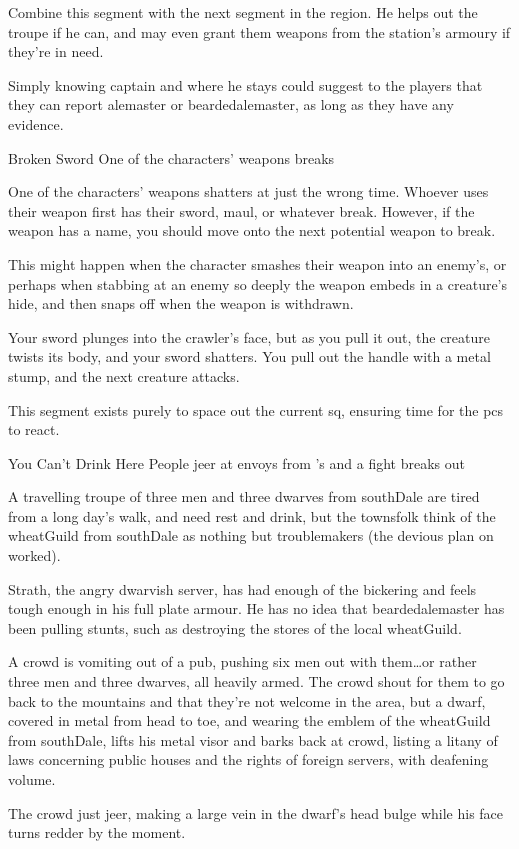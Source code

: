Combine this \gls{segment} with the next \gls{segment} in the \gls{region}.
He helps out the troupe if he can, and may even grant them \glspl{weapon} from the station's armoury if they're in need.

\captain

Simply knowing \gls{captain} and where he stays could suggest to the players that they can report \gls{alemaster} or \gls{beardedalemaster}, as long as they have any evidence.

{\squash Broken Sword}%
{One of the characters' weapons breaks}%

One of the characters' \glspl{weapon} shatters at just the wrong time.
Whoever uses their \gls{weapon} first has their sword, maul, or whatever break.
However, if the weapon has a name, you should move onto the next potential weapon to break.

This might happen when the character smashes their weapon into an enemy's, or perhaps when stabbing at an enemy so deeply the weapon embeds in a creature's hide, and then snaps off when the weapon is withdrawn.

\begin{boxtext}
  Your sword plunges into the \gls{crawler}'s face, but as you pull it out, the creature twists its body, and your sword shatters.
  You pull out the handle with a metal stump, and the next creature attacks.
\end{boxtext}

This \gls{segment} exists purely to space out the current \gls{sq}, ensuring time for the \glspl{pc} to react.

{You Can't Drink Here}%
{People jeer at envoys from 's  and a fight breaks out}%

A travelling troupe of three men and three dwarves from \gls{southDale} are tired from a long day's walk, and need rest and drink, but the townsfolk think of the \gls{wheatGuild} from \gls{southDale} as nothing but troublemakers (the devious plan on  worked).

Strath, the angry dwarvish \gls{server}, has had enough of the bickering and feels tough enough in his full plate armour.
He has no idea that \gls{beardedalemaster} has been pulling stunts, such as destroying the stores of the local \gls{wheatGuild}.

\begin{boxtext}
  A crowd is vomiting out of a pub, pushing six men out with them\ldots or rather three men and three dwarves, all heavily armed.
  The crowd shout for them to go back to the mountains and that they're not welcome in the area, but a dwarf, covered in metal from head to toe, and wearing the emblem of the \gls{wheatGuild} from \gls{southDale}, lifts his metal visor and barks back at crowd, listing a litany of laws concerning public houses and the rights of foreign \glspl{server}, with deafening volume.

  The crowd just jeer, making a large vein in the dwarf's head bulge while his face turns redder by the moment.
\end{boxtext}

